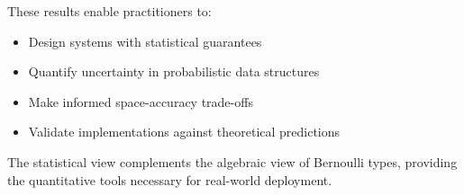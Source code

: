 \documentclass[11pt,final,hidelinks]{article}
\begin{document}
These results enable practitioners to:
\begin{itemize}
    \item Design systems with statistical guarantees
    \item Quantify uncertainty in probabilistic data structures
    \item Make informed space-accuracy trade-offs
    \item Validate implementations against theoretical predictions
\end{itemize}

The statistical view complements the algebraic view of Bernoulli types, providing the quantitative tools necessary for real-world deployment.


\end{document}
